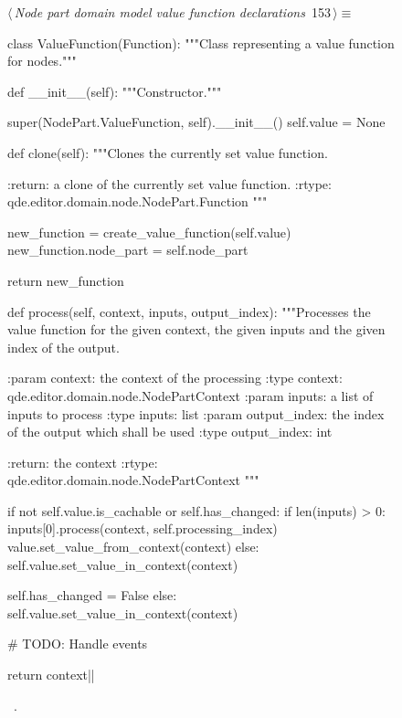 \documentclass[%
    a4paper,    %
    justified,  %
    nobib,      %
    openany     %
]{tufte-book}
\makeatletter
\renewcommand{\label}[1]{\@tufte@label{##1}}%
\makeatother
\begin{document}
\begin{figure}[!htbp]
\begin{flushleft} \small
\begin{minipage}{\linewidth}\label{scrap112}\raggedright\small
{} $\langle\,${\itshape Node part domain model value function declarations}\nobreak\ {\footnotesize {153}}$\,\rangle\equiv$
\vspace{-1ex}
\begin{pythoncode}
class ValueFunction(Function):
    """Class representing a value function for nodes."""

    def __init__(self):
        """Constructor."""

        super(NodePart.ValueFunction, self).__init__()
        self.value = None

    def clone(self):
        """Clones the currently set value function.

        :return: a clone of the currently set value function.
        :rtype: qde.editor.domain.node.NodePart.Function
        """

        new_function = create_value_function(self.value)
        new_function.node_part = self.node_part

        return new_function

    def process(self, context, inputs, output_index):
        """Processes the value function for the given context,
        the given inputs and the given index of the output.

        :param context: the context of the processing
        :type  context: qde.editor.domain.node.NodePartContext
        :param inputs: a list of inputs to process
        :type inputs: list
        :param output_index: the index of the output which shall
                             be used
        :type output_index: int

        :return: the context
        :rtype:  qde.editor.domain.node.NodePartContext
        """

        if not self.value.is_cachable or self.has_changed:
            if len(inputs) > 0:
                inputs[0].process(context, self.processing_index)
                value.set_value_from_context(context)
            else:
                self.value.set_value_in_context(context)

            self.has_changed = False
        else:
            self.value.set_value_in_context(context)

        # TODO: Handle events

        return context|\NWsep|
\end{pythoncode}
\vspace{1.5ex}
\footnotesize
\begin{list}{}{\setlength{\itemsep}{-\parsep}\setlength{\itemindent}{-\leftmargin}}
\item \NWtxtMacroRefIn\ .


\end{list}
\end{minipage}
\end{flushleft}
\end{figure}
\end{document}
